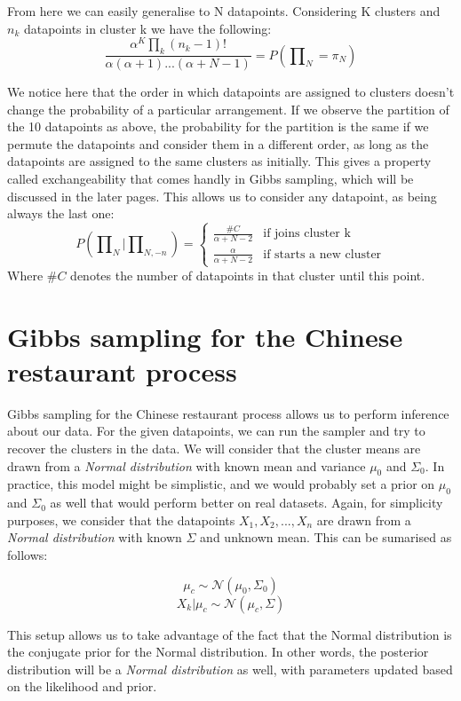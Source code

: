 \documentclass[12pt,a4paper]{article}
\begin{document}
From here we can easily generalise to N datapoints. Considering K clusters and $n_{k}$ datapoints in cluster k we have the following: $$\frac{\alpha^{K} \prod_{k}(n_{k}-1)!}{\alpha(\alpha+1)...(\alpha+N-1)} = P(\prod\nolimits_{N} = \pi_{N})$$

We notice here that the order in which datapoints are assigned to clusters doesn't change the probability of a particular arrangement. If we observe the partition of the 10 datapoints as above, the probability for the partition is the same if we permute the datapoints and consider them in a different order, as long as the datapoints are assigned to the same clusters as initially. This gives a property called exchangeability that comes handly in Gibbs sampling, which will be discussed in the later pages. This allows us to consider any datapoint, as being always the last one: 
$$P(\prod\nolimits_{N}|\prod\nolimits_{N, -n})= \left \{
    \begin{array}{ll}
		\frac{\#C}{\alpha+ N - 2} & \mbox{if joins cluster k} \\
		\frac{\alpha}{\alpha+N-2} & \mbox{if starts a new cluster} 
	\end{array}
\right. $$ Where $\#C$ denotes the number of datapoints in that cluster until this point.

\section{Gibbs sampling for the Chinese restaurant process}
Gibbs sampling for the Chinese restaurant process allows us to perform inference about our data. For the given datapoints, we can run the sampler and try to recover the clusters in the data. We will consider that the cluster means are drawn from a \textit{Normal distribution} with known mean and variance $\mu_{0}$ and $\Sigma_{0}$. In practice, this model might be simplistic, and we would probably set a prior on $\mu_{0}$ and $\Sigma_{0}$ as well that would perform better on real datasets. Again, for simplicity purposes, we consider that the datapoints $X_{1}, X_{2}, ..., X_{n}$ are drawn from a \textit{Normal distribution} with known $\Sigma$ and unknown mean. This can be sumarised as follows: 

$$ \mu_{c} \sim \mathcal{N}(\mu_{0}, \Sigma_{0})$$
$$ X_{k}|\mu_{c} \sim \mathcal{N}(\mu_{c}, \Sigma) $$

This setup allows us to take advantage of the fact that the Normal distribution is the conjugate prior for the Normal distribution. In other words, the posterior distribution will be a \textit{Normal distribution} as well, with parameters updated based on the likelihood and prior.
\end{document}
